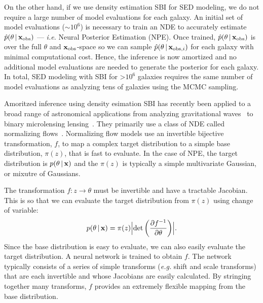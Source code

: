 On the other hand, if we use density estimation SBI for SED modeling, we do not
require a large number of model evaluations for each galaxy. 
An initial set of model evaluations (${\sim}10^6$) is necessary to train an NDE
to accurately estimate $\hat{p}(\theta \,|\, {\bf x}_{\rm obs})$ --- \emph{i.e.} Neural
Posterior Estimation (NPE).
Once trained, $\hat{p}(\theta \,|\, {\bf x}_{\rm obs})$ is over the full $\theta$ and
${\bf x}_{\rm obs}$-space so we can sample $\hat{p}(\theta \,|\, {\bf x}_{{\rm obs}, i})$
for each galaxy with minimal computational cost. 
Hence, the inference is now amortized and no additional model evaluations are
needed to generate the posterior for each galaxy. 
In total, SED modeling with SBI for >$10^6$ galaxies requires the same number
of model evaluations as analyzing tens of galaxies using the MCMC sampling. 

Amoritzed inference using density esimation SBI has recently been applied to a
broad range of astronomical applications from analyzing gravitational
waves~\citep[\emph{e.g.}][]{wong2020,dax2021} to binary microlensing
lensing~\citep{zhang2021}.
They primarily use a class of NDE called normalizing flows~\citep{tabak2010,
tabak2013}.
Normalizing flow models use an invertible bijective transformation, $f$, to map
a complex target distribution to a simple base distribution, $\pi(z)$, that is
fast to evaluate.
In the case of NPE, the target distribution is $p(\theta \,|\, {\bf x})$ and
the $\pi(z)$ is typically a simple multivariate Gaussian, or mixutre of
Gaussians. 

The transformation $f: z \rightarrow \theta$ must be invertible and have a
tractable Jacobian. 
This is so that we can evaluate the target distribution from $\pi(z)$ using
change of variable:  
\begin{equation}
    p(\theta \given {\bf x}) = \pi(z) \Bigl|{\rm det} \left(\frac{\partial
    f^{-1}}{\partial \theta} \right)\Bigr|.
\end{equation} 
Since the base distribution is easy to evaluate, we can also easily evaluate
the target distribution.  
A neural network is trained to obtain $f$.
The network typically consists of a series of simple transforms (\emph{e.g.}
shift and scale transforms) that are each invertible and whose Jacobians are
easily calculated. 
By stringing together many transforms, $f$ provides an extremely flexible
mapping from the base distribution.


